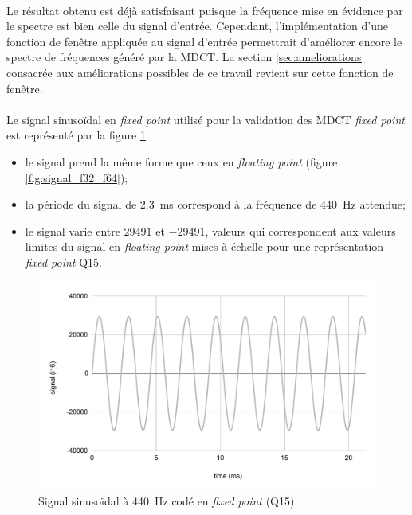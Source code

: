 \documentclass{article}
\begin{document}
    \paragraph{}
    Le résultat obtenu est déjà satisfaisant puisque la fréquence mise en évidence par le spectre est bien celle du signal d'entrée. Cependant, l'implémentation d'une fonction de fenêtre appliquée au signal d'entrée permettrait d'améliorer encore le spectre de fréquences généré par la MDCT. La section \ref{sec:ameliorations} consacrée aux améliorations possibles de ce travail revient sur cette fonction de fenêtre.

    \paragraph{}
    Le signal sinusoïdal en \emph{fixed point} utilisé pour la validation des MDCT \emph{fixed point} est représenté par la figure \ref{fig:signal_i16} :
    \begin{itemize}
        \item le signal prend la même forme que ceux en \emph{floating point} (figure \ref{fig:signal_f32_f64});
        \item la période du signal de \SI{2.3}{\milli\second} correspond à la fréquence de \SI{440}{\hertz} attendue;
        \item le signal varie entre $29491$ et $-29491$, valeurs qui correspondent aux valeurs limites du signal en \emph{floating point} mises à échelle pour une représentation \emph{fixed point} Q15.
    \end{itemize}

    \begin{figure}[H]
        \centering
        \includegraphics[width=.8\linewidth]{./images/signal_i16.pdf}
        \caption{Signal sinusoïdal à \SI{440}{\hertz} codé en \emph{fixed point} (Q15)}
        \label{fig:signal_i16}
    \end{figure}
\end{document}
